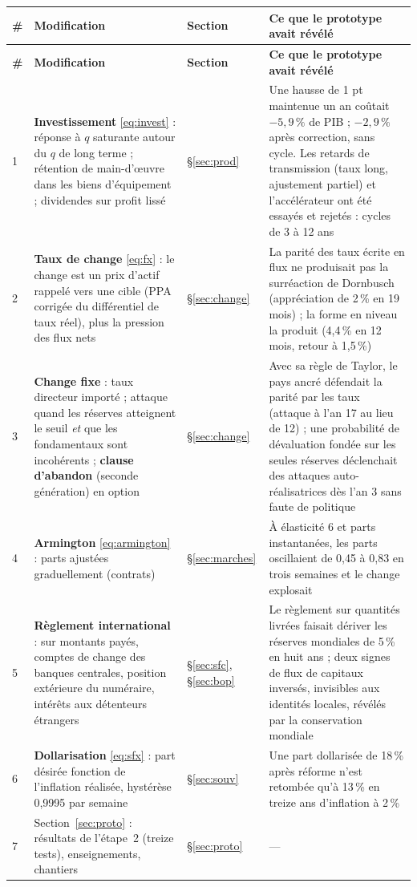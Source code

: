 \documentclass[11pt,a4paper]{article}
\begin{document}
\begin{center}\small
\begin{longtable}{p{0.5cm}p{6.6cm}p{2.1cm}p{5.8cm}}
\toprule
\textbf{\#} & \textbf{Modification} & \textbf{Section} & \textbf{Ce que le prototype avait révélé}\\
\midrule
\endfirsthead
\toprule
\textbf{\#} & \textbf{Modification} & \textbf{Section} & \textbf{Ce que le prototype avait révélé}\\
\midrule
\endhead
1 & \textbf{Investissement} \eqref{eq:invest} : réponse à $q$ saturante autour du $q$ de long terme ; rétention de main-d'œuvre dans les biens d'équipement ; dividendes sur profit lissé & \S\ref{sec:prod} & Une hausse de 1 pt maintenue un an coûtait $-5{,}9\,\%$ de PIB ; $-2{,}9\,\%$ après correction, sans cycle. Les retards de transmission (taux long, ajustement partiel) et l'accélérateur ont été essayés et rejetés : cycles de 3 à 12 ans\\
2 & \textbf{Taux de change} \eqref{eq:fx} : le change est un prix d'actif rappelé vers une cible (PPA corrigée du différentiel de taux réel), plus la pression des flux nets & \S\ref{sec:change} & La parité des taux écrite en flux ne produisait pas la surréaction de Dornbusch (appréciation de 2\,\% en 19 mois) ; la forme en niveau la produit (4,4\,\% en 12 mois, retour à 1,5\,\%)\\
3 & \textbf{Change fixe} : taux directeur importé ; attaque quand les réserves atteignent le seuil \emph{et} que les fondamentaux sont incohérents ; \textbf{clause d'abandon} (seconde génération) en option & \S\ref{sec:change} & Avec sa règle de Taylor, le pays ancré défendait la parité par les taux (attaque à l'an 17 au lieu de 12) ; une probabilité de dévaluation fondée sur les seules réserves déclenchait des attaques auto-réalisatrices dès l'an 3 sans faute de politique\\
4 & \textbf{Armington} \eqref{eq:armington} : parts ajustées graduellement (contrats) & \S\ref{sec:marches} & À élasticité 6 et parts instantanées, les parts oscillaient de 0,45 à 0,83 en trois semaines et le change explosait\\
5 & \textbf{Règlement international} : sur montants payés, comptes de change des banques centrales, position extérieure du numéraire, intérêts aux détenteurs étrangers & \S\ref{sec:sfc}, \S\ref{sec:bop} & Le règlement sur quantités livrées faisait dériver les réserves mondiales de 5\,\% en huit ans ; deux signes de flux de capitaux inversés, invisibles aux identités locales, révélés par la conservation mondiale\\
6 & \textbf{Dollarisation} \eqref{eq:sfx} : part désirée fonction de l'inflation réalisée, hystérèse 0,9995 par semaine & \S\ref{sec:souv} & Une part dollarisée de 18\,\% après réforme n'est retombée qu'à 13\,\% en treize ans d'inflation à 2\,\%\\
7 & Section~\ref{sec:proto} : résultats de l'étape~2 (treize tests), enseignements, chantiers & \S\ref{sec:proto} & ---\\
\bottomrule
\end{longtable}
\end{center}
\end{document}
